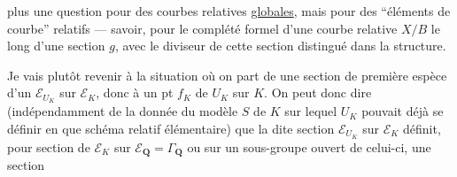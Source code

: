 plus une question pour des courbes relatives \uline{globales}, mais pour des ``éléments de courbe'' relatifs --- savoir, pour le complété formel d'une courbe relative $X/B$ le long d'une section $g$, avec le diviseur de cette section distingué dans la structure.

Je vais plutôt revenir à la situation où on part de une section de première espèce d'un $\mathcal E_{U_K}$ sur $\mathcal E_K$,  donc à un pt  $f_K$ de $U_K$ sur $K$. On peut donc dire (indépendamment de la donnée du modèle $S$ de $K$ sur lequel $U_K$ pouvait déjà se définir en  que schéma relatif élémentaire) que la dite section  $\mathcal E_{U_K}$ sur $\mathcal E_K$  définit, pour  section de $\mathcal E_K$ sur $\mathcal E_{\mathbf Q}=\Gamma_{\mathbf Q}$ ou sur un sous-groupe ouvert  de celui-ci, une section
